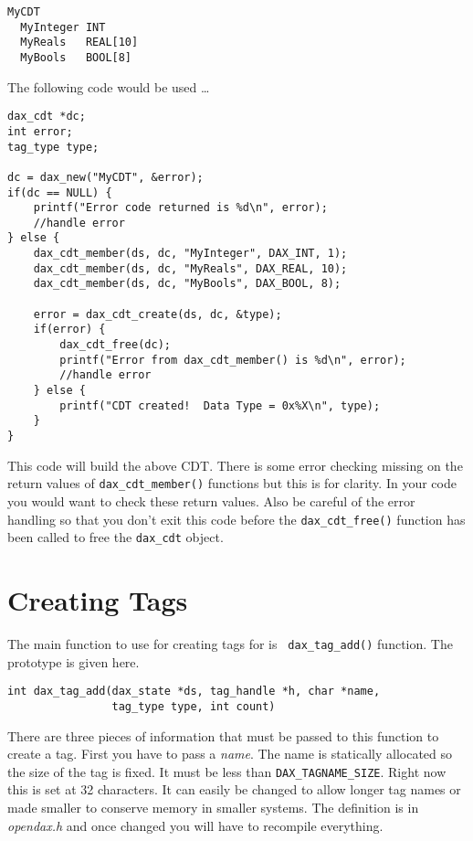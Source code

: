 \begin{verbatim}
MyCDT
  MyInteger INT
  MyReals   REAL[10]
  MyBools   BOOL[8]
\end{verbatim}

The following code would be used \ldots

\begin{verbatim}
dax_cdt *dc;
int error;
tag_type type;

dc = dax_new("MyCDT", &error);
if(dc == NULL) {
    printf("Error code returned is %d\n", error);
    //handle error
} else {
    dax_cdt_member(ds, dc, "MyInteger", DAX_INT, 1);
    dax_cdt_member(ds, dc, "MyReals", DAX_REAL, 10);
    dax_cdt_member(ds, dc, "MyBools", DAX_BOOL, 8);

    error = dax_cdt_create(ds, dc, &type);
    if(error) {
        dax_cdt_free(dc);
        printf("Error from dax_cdt_member() is %d\n", error);
	    //handle error
    } else {
        printf("CDT created!  Data Type = 0x%X\n", type);
    }
}

\end{verbatim}

This code will build the above CDT.  There is some error checking missing on the return values of \verb|dax_cdt_member()| functions but this is for clarity.  In your code you would want to check these return values.  Also be careful of the error handling so that you don't exit this code before the \verb|dax_cdt_free()| function has been called to free the \verb|dax_cdt| object.



\section{Creating Tags}
The main function to use for creating tags for \opendax is \verb| dax_tag_add()| function.  The prototype is given here.

\begin{verbatim}
int dax_tag_add(dax_state *ds, tag_handle *h, char *name,
                tag_type type, int count)
\end{verbatim}

There are three pieces of information that must be passed to this function to create a tag.  First you have to pass a \emph{name}.  The name is statically allocated so the size of the tag is fixed.  It must be less than \verb|DAX_TAGNAME_SIZE|.  Right now this is set at 32 characters.  It can easily be changed to allow longer tag names or made smaller to conserve memory in smaller systems.  The definition is in \emph{opendax.h} and once changed you will have to recompile everything.

